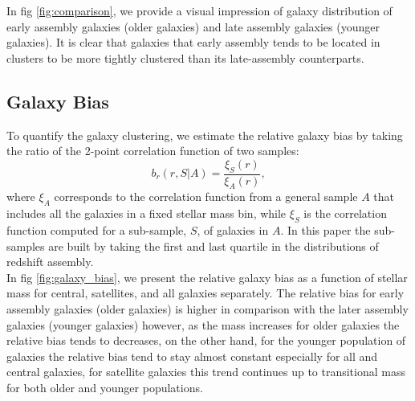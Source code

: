 \documentclass[a4paper,fleqn,usenatbib]{mnras}
\begin{document}
In fig \ref{fig:comparison}, we provide a visual impression of galaxy distribution of early assembly galaxies (older galaxies) and late assembly galaxies (younger galaxies). It is clear that galaxies that early assembly tends to be located in clusters to be more tightly clustered than its late-assembly counterparts. 

\subsection{Galaxy Bias}
To quantify the galaxy clustering, we estimate the relative galaxy bias by taking the ratio of the 2-point correlation function of two samples:
%
\begin{equation}
b_r(r, S|A)= \frac{\xi_S(r)}{\xi_A(r)}, 
\label{eq:relative}
\end{equation}
%
where $\xi_A$ corresponds to the correlation function from a general sample $A$ that includes all the galaxies in a fixed stellar mass bin, while $\xi_S$ is the correlation function computed for a sub-sample, $S$, of galaxies in $A$. In this paper the sub-samples are built by taking the first and last quartile in the distributions of redshift assembly.\\

In fig \ref{fig:galaxy_bias}, we present the relative galaxy bias as a function of stellar mass for central, satellites, and all galaxies separately. The relative bias for early assembly galaxies (older galaxies) is higher in comparison with the later assembly galaxies (younger galaxies) however, as the mass increases for older galaxies the relative bias tends to decreases, on the other hand, for the younger population of galaxies the relative bias tend to stay almost constant especially for all and central galaxies, for satellite galaxies this trend continues up to transitional mass for both older and younger populations.

\end{document}
